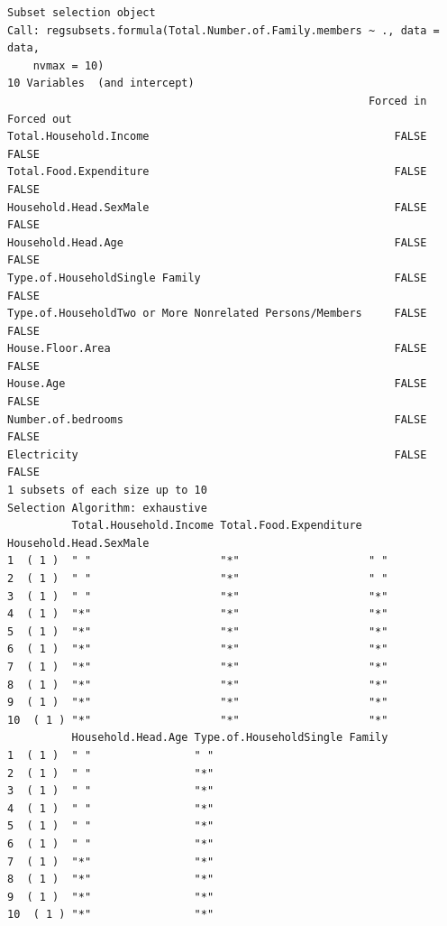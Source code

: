\documentclass[
]{article}
\begin{document}
\begin{verbatim}
Subset selection object
Call: regsubsets.formula(Total.Number.of.Family.members ~ ., data = data, 
    nvmax = 10)
10 Variables  (and intercept)
                                                        Forced in Forced out
Total.Household.Income                                      FALSE      FALSE
Total.Food.Expenditure                                      FALSE      FALSE
Household.Head.SexMale                                      FALSE      FALSE
Household.Head.Age                                          FALSE      FALSE
Type.of.HouseholdSingle Family                              FALSE      FALSE
Type.of.HouseholdTwo or More Nonrelated Persons/Members     FALSE      FALSE
House.Floor.Area                                            FALSE      FALSE
House.Age                                                   FALSE      FALSE
Number.of.bedrooms                                          FALSE      FALSE
Electricity                                                 FALSE      FALSE
1 subsets of each size up to 10
Selection Algorithm: exhaustive
          Total.Household.Income Total.Food.Expenditure Household.Head.SexMale
1  ( 1 )  " "                    "*"                    " "                   
2  ( 1 )  " "                    "*"                    " "                   
3  ( 1 )  " "                    "*"                    "*"                   
4  ( 1 )  "*"                    "*"                    "*"                   
5  ( 1 )  "*"                    "*"                    "*"                   
6  ( 1 )  "*"                    "*"                    "*"                   
7  ( 1 )  "*"                    "*"                    "*"                   
8  ( 1 )  "*"                    "*"                    "*"                   
9  ( 1 )  "*"                    "*"                    "*"                   
10  ( 1 ) "*"                    "*"                    "*"                   
          Household.Head.Age Type.of.HouseholdSingle Family
1  ( 1 )  " "                " "                           
2  ( 1 )  " "                "*"                           
3  ( 1 )  " "                "*"                           
4  ( 1 )  " "                "*"                           
5  ( 1 )  " "                "*"                           
6  ( 1 )  " "                "*"                           
7  ( 1 )  "*"                "*"                           
8  ( 1 )  "*"                "*"                           
9  ( 1 )  "*"                "*"                           
10  ( 1 ) "*"                "*"                           

\end{verbatim}
\end{document}
